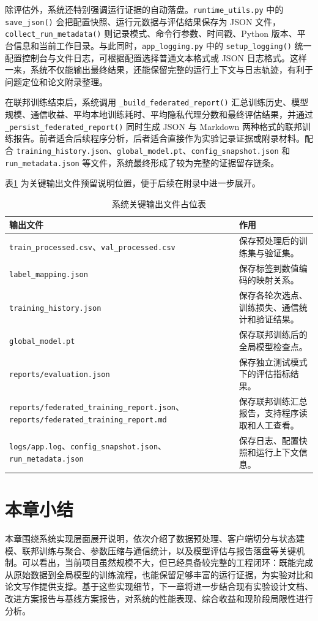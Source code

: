 除评估外，系统还特别强调运行证据的自动落盘。\texttt{runtime\_utils.py} 中的 \texttt{save\_json()} 会把配置快照、运行元数据与评估结果保存为 JSON 文件，\texttt{collect\_run\_metadata()} 则记录模式、命令行参数、时间戳、Python 版本、平台信息和当前工作目录。与此同时，\texttt{app\_logging.py} 中的 \texttt{setup\_logging()} 统一配置控制台与文件日志，可根据配置选择普通文本格式或 JSON 日志格式。这样一来，系统不仅能输出最终结果，还能保留完整的运行上下文与日志轨迹，有利于问题定位和论文附录整理。

在联邦训练结束后，系统调用 \texttt{\_build\_federated\_report()} 汇总训练历史、模型规模、通信收益、平均本地训练耗时、平均隐私代理分数和最终评估结果，并通过 \texttt{\_persist\_federated\_report()} 同时生成 JSON 与 Markdown 两种格式的联邦训练报告。前者适合后续程序分析，后者适合直接作为实验记录证据或附录材料。配合 \texttt{training\_history.json}、\texttt{global\_model.pt}、\texttt{config\_snapshot.json} 和 \texttt{run\_metadata.json} 等文件，系统最终形成了较为完整的证据留存链条。

表\ref{tab:outputs-placeholder} 为关键输出文件预留说明位置，便于后续在附录中进一步展开。

\begin{table}[htbp]
    \centering
    \caption{系统关键输出文件占位表}
    \label{tab:outputs-placeholder}
    \begin{tabular}{p{4.1cm}p{8.1cm}}
        \toprule
        输出文件 & 作用 \\
        \midrule
        \texttt{train\_processed.csv}、\texttt{val\_processed.csv} & 保存预处理后的训练集与验证集。 \\
        \texttt{label\_mapping.json} & 保存标签到数值编码的映射关系。 \\
        \texttt{training\_history.json} & 保存各轮次选点、训练损失、通信统计和验证结果。 \\
        \texttt{global\_model.pt} & 保存联邦训练后的全局模型检查点。 \\
        \texttt{reports/evaluation.json} & 保存独立测试模式下的评估指标结果。 \\
        \texttt{reports/federated\_training\_report.json}、\texttt{reports/federated\_training\_report.md} & 保存联邦训练汇总报告，支持程序读取和人工查看。 \\
        \texttt{logs/app.log}、\texttt{config\_snapshot.json}、\texttt{run\_metadata.json} & 保存日志、配置快照和运行上下文信息。 \\
        \bottomrule
    \end{tabular}
\end{table}

\section{本章小结}
\label{sec:implementation-summary}

本章围绕系统实现层面展开说明，依次介绍了数据预处理、客户端切分与状态建模、联邦训练与聚合、参数压缩与通信统计，以及模型评估与报告落盘等关键机制。可以看出，当前项目虽然规模不大，但已经具备较完整的工程闭环：既能完成从原始数据到全局模型的训练流程，也能保留足够丰富的运行证据，为实验对比和论文写作提供支撑。基于这些实现细节，下一章将进一步结合现有实验设计文档、改进方案报告与基线方案报告，对系统的性能表现、综合收益和现阶段局限性进行分析。
